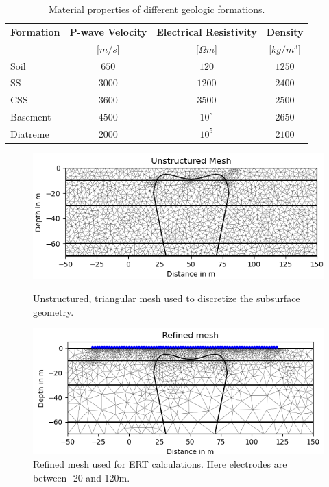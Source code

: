 \begin{table}[]
\caption{Material properties of different geologic formations.}
\centering
\begin{tabular}{lccc}
\hline 
\textbf{Formation} & \textbf{P-wave Velocity}  & \textbf{Electrical Resistivity}  & \textbf{Density}  \\
& [$m/s$]  & [$\Omega m$]  & [$kg/m^3$]\\ \hline 
Soil & $650$ & $120$ & $1250$\\
SS & $3000$ & $1200$ & $2400$\\
CSS & $3600$ & $3500$ & $2500$\\
Basement & $4500$ & $10^8$ & $2650$\\
Diatreme & $2000$ & $10^5$ & $2100$\\
 \hline 
\end{tabular}
\label{table:properties}
\end{table}


\begin{figure}[]
  \centering
  \begin{minipage}[b]{0.49\textwidth}
    \includegraphics[width=\textwidth]{Figures/Mesh.png}
    \caption[Unstructured mesh]{Unstructured, triangular mesh used to discretize the subsurface geometry.}
    \label{figure:mesh}
  \end{minipage}
  \hfill
  \begin{minipage}[b]{0.49\textwidth}
    \includegraphics[width=\textwidth]{Figures/ERT_refined_mesh.png}
    \caption[Refined mesh used for ERT calculations]{Refined mesh used for ERT calculations. Here electrodes are between -20 and 120m.}
    \label{figure:refined_mesh}
  \end{minipage}
\end{figure}

